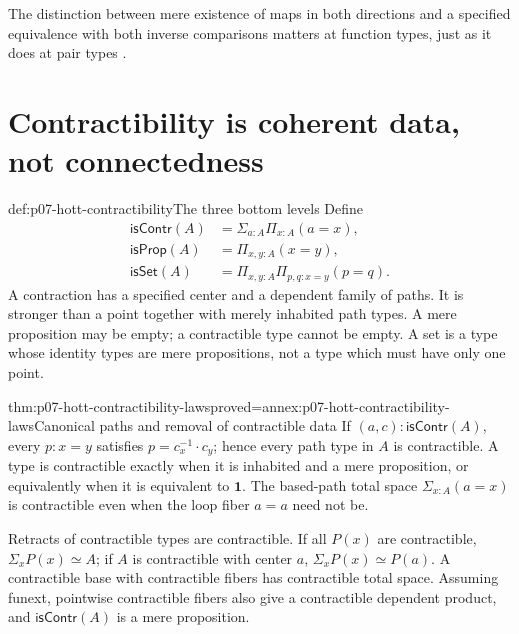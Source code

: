 The distinction between mere existence of maps in both directions and a
specified equivalence with both inverse comparisons matters at function
types, just as it does at pair types
\parencite[\S2.6--2.9]{HoTT2013PublicReleaseFoundations}.

\section{Contractibility is coherent data, not connectedness}
\label{sec:p07-hott-contractibility}

\begin{hbdefinition}{def:p07-hott-contractibility}{The three bottom levels}
Define
\[
 \begin{aligned}
 \mathsf{isContr}(A)&=\Sigma_{a:A}\Pi_{x:A}(a=x),\\
 \mathsf{isProp}(A)&=\Pi_{x,y:A}(x=y),\\
 \mathsf{isSet}(A)&=\Pi_{x,y:A}\Pi_{p,q:x=y}(p=q).
 \end{aligned}
\]
A contraction has a specified center and a dependent family of paths.
It is stronger than a point together with merely inhabited path types.
A mere proposition may be empty; a contractible type cannot be empty.
A set is a type whose identity types are mere propositions, not a type
which must have only one point.
\end{hbdefinition}

\begin{hbtheorem}{thm:p07-hott-contractibility-laws}{proved=annex:p07-hott-contractibility-laws}{Canonical paths and removal of contractible data}
If $(a,c):\mathsf{isContr}(A)$, every $p:x=y$ satisfies
$p=c_x^{-1}\cdot c_y$; hence every path type in $A$ is contractible.
A type is contractible exactly when it is inhabited and a mere proposition,
or equivalently when it is equivalent to $\mathbf1$.
The based-path total space $\Sigma_{x:A}(a=x)$ is contractible even when
the loop fiber $a=a$ need not be.

Retracts of contractible types are contractible. If all $P(x)$ are
contractible, $\Sigma_xP(x)\simeq A$; if $A$ is contractible with center
$a$, $\Sigma_xP(x)\simeq P(a)$. A contractible base with contractible
fibers has contractible total space. Assuming funext, pointwise contractible
fibers also give a contractible dependent product, and
$\mathsf{isContr}(A)$ is a mere proposition.
\end{hbtheorem}

